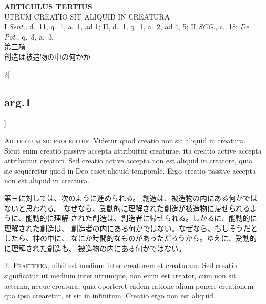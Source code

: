 \documentclass[paper=a4paper,fontsize=10pt,jafontsize=9pt,titlepage]{jlreq}
\begin{document}
\newpage
{}
{}
\setcounter{section}{3}
\setcounter{subsection}{0}


\begin{center}
 {\Large {\bfseries ARTICULUS TERTIUS}}\\
 {\large UTRUM CREATIO SIT ALIQUID IN CREATURA}\\
 {\footnotesize I {\itshape Sent.}, d.~11, q.~1, a.~1, ad 1; II, d.~1,
 q.~1, a.~2, ad 4, 5; II {\itshape SCG.}, c.~18; {\itshape De Pot.},
 q.~3, a.~3.}\\
 {\Large 第三項\\創造は被造物の中の何かか}
\end{center}


\begin{paracol}{2}[\subsection{arg.1}]

{\huge A}{\scshape d tertium sic proceditur}. Videtur quod creatio non sit aliquid in
 creatura. Sicut enim creatio passive accepta attribuitur creaturae, ita
 creatio active accepta attribuitur creatori. Sed creatio active accepta
 non est aliquid in creatore, quia sic sequeretur quod in Deo esset
 aliquid temporale. Ergo creatio passive accepta non est aliquid in
 creatura.

\switchcolumn

第三に対しては、次のように進められる。
創造は、被造物の内にある何かではないと思われる。
なぜなら、受動的に理解された創造が被造物に帰せられるように、能動的に理解
 された創造は、創造者に帰せられる。しかるに、能動的に理解された創造は、
 創造者の内にある何かではない。なぜなら、もしそうだとしたら、神の中に、
 なにか時間的なものがあっただろうから。ゆえに、受動的に理解された創造も、
 被造物の内にある何かではない。


2.~{\scshape Praeterea}, nihil est medium inter creatorem et creaturam. Sed creatio
 significatur ut medium inter utrumque, non enim est creator, cum non
 sit aeterna; neque creatura, quia oporteret eadem ratione aliam ponere
 creationem qua ipsa crearetur, et sic in infinitum. Creatio ergo non
 est aliquid.


\end{paracol}
\end{document}

